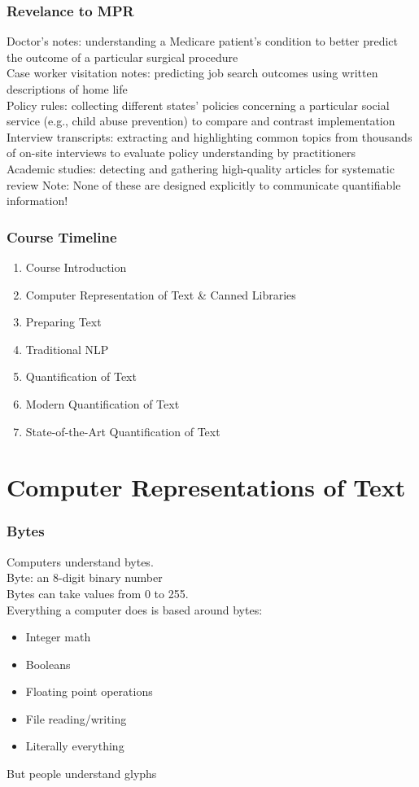 \documentclass[smaller,xcolor=table,aspectratio=169]{beamer}
\begin{document}
\begin{frame}
  \frametitle{Revelance to MPR}
  Doctor's notes:  understanding a Medicare patient's condition to better predict the outcome of a particular surgical procedure\\
  Case worker visitation notes:  predicting job search outcomes using written descriptions of home life\\
  Policy rules:  collecting different states' policies concerning a particular social service (e.g., child abuse prevention) to compare and contrast implementation\\
  Interview transcripts:  extracting and highlighting common topics from thousands of on-site interviews to evaluate policy understanding by practitioners\\
  Academic studies:  detecting and gathering high-quality articles for systematic review
  \vfill{}
  Note: None of these are designed explicitly to communicate quantifiable information!
\end{frame}

\begin{frame}
  \frametitle{Course Timeline}
  \begin{enumerate}
    \item Course Introduction
    \item Computer Representation of Text \& Canned Libraries
    \item Preparing Text
    \item Traditional NLP
    \item Quantification of Text
    \item Modern Quantification of Text
    \item State-of-the-Art Quantification of Text
  \end{enumerate}
\end{frame}

\section{Computer Representations of Text}

\begin{frame}
  \frametitle{Bytes}
  Computers understand bytes.\\\pause{}
  Byte: an 8-digit binary number\\\pause{}
  Bytes can take values from 0 to 255.\\\pause{}
  Everything a computer does is based around bytes:\\\pause{}
  \begin{itemize}
    \item Integer math
    \item Booleans
    \item Floating point operations
    \item File reading/writing
    \item Literally everything
  \end{itemize}
  But people understand glyphs
\end{frame}
\end{document}
